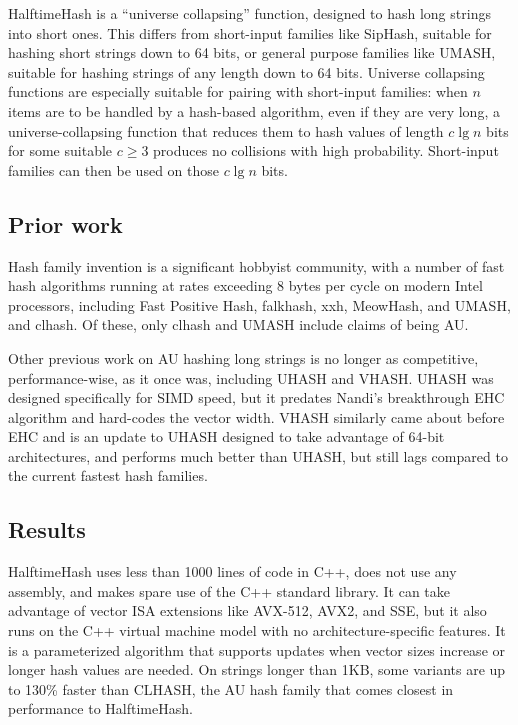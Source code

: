 \documentclass[acmsmall, nonacm]{acmart}
\begin{document}
HalftimeHash is a ``universe collapsing'' function, designed to hash long strings into short ones. \cite{linear-hash-functions,hashing-without-primes-revisited,cuckoo-journal}
This differs from short-input families like SipHash, suitable for hashing short strings down to 64 bits, or general purpose families like UMASH, suitable for hashing strings of any length down to 64 bits.
Universe collapsing functions are especially suitable for pairing with short-input families: when $n$ items are to be handled by a hash-based algorithm, even if they are very long, a universe-collapsing function that reduces them to hash values of length $c \lg n$ bits for some suitable $c \geq 3$ produces no collisions with high probability.
Short-input families can then be used on those $c \lg n$ bits. \cite{universe-collapse-linear-probing,siphash,tabulation,simple-hash-functions-work}

\subsection{Prior work}

Hash family invention is a significant hobbyist community, with a number of fast hash algorithms running at rates exceeding 8 bytes per cycle on modern Intel processors, including Fast Positive Hash, falk\-hash, xxh, Meow\-Hash, and UMASH, and cl\-hash. \cite{smhasher}
Of these, only cl\-hash and U\-MASH include claims of being AU.

Other previous work on AU hashing long strings is no longer as competitive, performance-wise, as it once was, including UHASH and VHASH.
UHASH was designed specifically for SIMD speed, but it predates Nandi's breakthrough EHC algorithm and hard-codes the vector width. \cite{umac}
VHASH similarly came about before EHC and is an update to UHASH designed to take advantage of 64-bit architectures, and performs much better than UHASH, but still lags compared to the current fastest hash families. \cite{vmac,smhasher}

\subsection{Results}

HalftimeHash uses less than 1000 lines of code in C++, does not use any assembly, and makes spare use of the C++ standard library.
It can take advantage of vector ISA extensions like AVX-512, AVX2, and SSE, but it also runs on the C++ virtual machine model with no architecture-specific features.
It is a parameterized algorithm that supports updates when vector sizes increase or longer hash values are needed.
On strings longer than 1KB, some variants are up to 130\% faster than CLHASH, the AU hash family that comes closest in performance to HalftimeHash.
\end{document}
